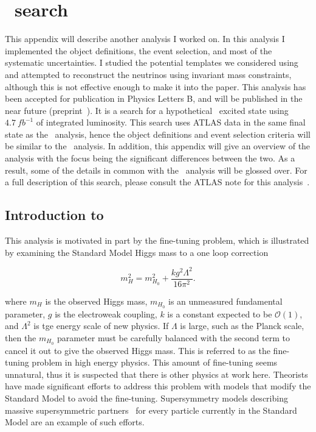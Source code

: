 \chapter{\bstar\ search}
\label{SECTION-BPRIME}

This appendix will describe another analysis I worked on. In this analysis I implemented the object definitions, the event selection, and most of the systematic uncertainties. I studied the potential templates we considered using and attempted to reconstruct the neutrinos using invariant mass constraints, although this is not effective enough to make it into the paper. This analysis has been accepted for publication in Physics Letters B, and will be published in the near future (preprint~\cite{BPRIMEPREPRINT}). It is a search for a hypothetical \bstar\ excited state using $4.7\ fb^{-1}$ of integrated luminosity. This search uses ATLAS data in the same final state as the \Wtchan\ analysis, hence the object definitions and event selection criteria will be similar to the \Wtchan\ analysis. In addition, this appendix will give an overview of the analysis with the focus being the significant differences between the two. As a result, some of the details in common with the \Wtchan\ analysis will be glossed over. For a full description of this search, please consult the ATLAS note for this analysis~\cite{BPRIMEINT}.

\section{Introduction to \bstar}

This analysis is motivated in part by the fine-tuning problem, which is illustrated by examining the Standard Model Higgs mass to a one loop correction~\cite{PDG}
 
\begin{equation}
m_{H}^2 = m_{H_0}^2 + \frac{kg^2\Lambda^2}{16\pi^2}.
\end{equation}

\noindent

where $m_{H}$ is the observed Higgs mass, $m_{H_0}$ is an unmeasured fundamental parameter, $g$ is the electroweak coupling, $k$ is a constant expected to be $\mathcal{O}(1)$, and $\Lambda^2$ is tge energy scale of new physics. If $\Lambda$ is large, such as the Planck scale, then the $m_{H_0}$ parameter must be carefully balanced with the second term to cancel it out to give the observed Higgs mass. This is referred to as the fine-tuning problem in high energy physics. This amount of fine-tuning seems unnatural, thus it is suspected that there is other physics at work here. Theorists have made significant efforts to address this problem with models that modify the Standard Model to avoid the fine-tuning. Supersymmetry models describing massive supersymmetric partners~\cite{PDG} for every particle currently in the Standard Model are an example of such efforts.

